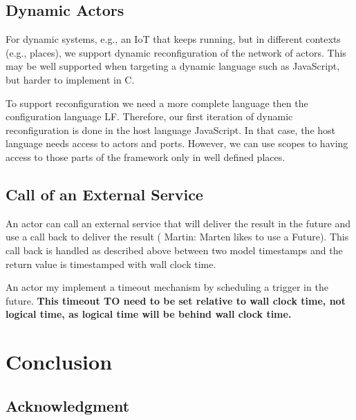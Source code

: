 \documentclass[sigconf]{acmart}
\newcommand{\martin}[1]{{\color{blue} Martin: #1}}
\begin{document}
\subsection{Dynamic Actors}

For dynamic systems, e.g., an IoT that keeps running, but in different contexts
(e.g., places), we support dynamic reconfiguration of the network of actors.
This may be well supported when targeting a dynamic language such as JavaScript,
but harder to implement in C.

To support reconfiguration we need a more complete language then the configuration
language LF. Therefore, our first iteration of dynamic reconfiguration is done in the
host language JavaScript. In that case, the host language needs access to actors and
ports. However, we can use scopes to having access to those parts of the framework
only in well defined places.

\subsection{Call of an External Service}

An actor can call an external service that will deliver the result in the future
and use a call back to deliver the result (\martin{Marten likes to use a Future}).
This call back is handled as described above between two model timestamps
and the return value is timestamped with wall clock time.

An actor my implement a timeout mechanism by scheduling a trigger in the future.
{\bf This timeout TO need to be set relative to wall clock time, not logical
time, as logical time will be behind wall clock time.}



\section{Conclusion}
\label{sec:conclusion}


\subsection*{Acknowledgment}



 
\end{document}
